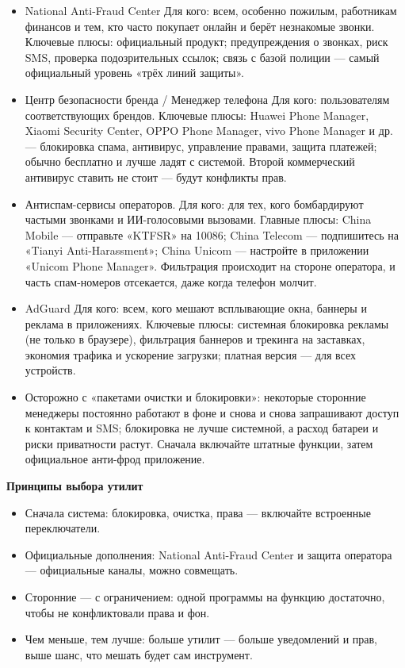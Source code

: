 
\begin{itemize}
  \item National Anti-Fraud Center Для кого: всем, особенно пожилым, работникам финансов и тем, кто часто покупает онлайн и берёт незнакомые звонки. Ключевые плюсы: официальный продукт; предупреждения о звонках, риск SMS, проверка подозрительных ссылок; связь с базой полиции — самый официальный уровень «трёх линий защиты».
  \item Центр безопасности бренда / Менеджер телефона Для кого: пользователям соответствующих брендов. Ключевые плюсы: Huawei Phone Manager, Xiaomi Security Center, OPPO Phone Manager, vivo Phone Manager и др. — блокировка спама, антивирус, управление правами, защита платежей; обычно бесплатно и лучше ладят с системой. Второй коммерческий антивирус ставить не стоит — будут конфликты прав.
  \item Антиспам-сервисы операторов. Для кого: для тех, кого бомбардируют частыми звонками и ИИ-голосовыми вызовами. Главные плюсы: China Mobile — отправьте «KTFSR» на 10086; China Telecom — подпишитесь на «Tianyi Anti-Harassment»; China Unicom — настройте в приложении «Unicom Phone Manager». Фильтрация происходит на стороне оператора, и часть спам-номеров отсекается, даже когда телефон молчит.
  \item AdGuard Для кого: всем, кого мешают всплывающие окна, баннеры и реклама в приложениях. Ключевые плюсы: системная блокировка рекламы (не только в браузере), фильтрация баннеров и трекинга на заставках, экономия трафика и ускорение загрузки; платная версия — для всех устройств.
  \item Осторожно с «пакетами очистки и блокировки»: некоторые сторонние менеджеры постоянно работают в фоне и снова и снова запрашивают доступ к контактам и SMS; блокировка не лучше системной, а расход батареи и риски приватности растут. Сначала включайте штатные функции, затем официальное анти-фрод приложение.
\end{itemize}

\textbf{Принципы выбора утилит}\par

\begin{itemize}
  \item Сначала система: блокировка, очистка, права — включайте встроенные переключатели.
  \item Официальные дополнения: National Anti-Fraud Center и защита оператора — официальные каналы, можно совмещать.
  \item Сторонние — с ограничением: одной программы на функцию достаточно, чтобы не конфликтовали права и фон.
  \item Чем меньше, тем лучше: больше утилит — больше уведомлений и прав, выше шанс, что мешать будет сам инструмент.
\end{itemize}

